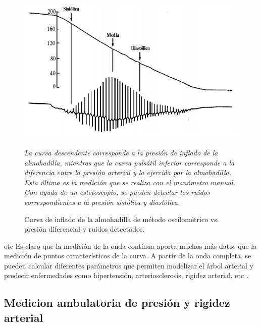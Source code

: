 \begin{figure}[!htbp]
	\centering
	\begin{minipage}{0.65\textwidth}
		\includegraphics[width=\textwidth]{./Figures/moscilometrico.png}
		{\footnotesize \textit{La curva descendente corresponde a la presión de inflado de la almohadilla, mientras que la 	curva pulsátil inferior corresponde a la diferencia entre la presión arterial y la ejercida por la almohadilla. Esta última es la medición que se realiza con el manómetro manual. Con ayuda de un estetoscopio, se pueden detectar los ruidos correspondientes a la presión sistólica y diastólica.}\par}		
	\end{minipage}	
	
	\caption{Curva de inflado de la almohadilla de método oscilométrico vs. presión diferencial y ruidos detectados.}
	\label{fig:moscilometrico}
\end{figure}
etc
Es claro que la medición de la onda contínua aporta muchos más datos que la medición de puntos característicos de la curva. A partir de la onda completa, se pueden calcular diferentes parámetros que permiten modelizar el árbol arterial y predecir enfermedades como hipertensión, arteriosclerosis, rigidez arterial, etc \citep{saito2011}  \citep{figueroa2014}.


\subsection{Medicion ambulatoria de presión y rigidez arterial}

